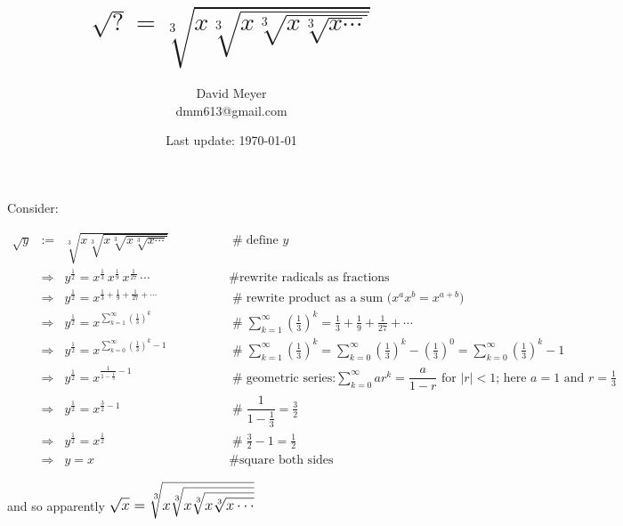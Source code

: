 \documentclass{article}
\title{$\sqrt{?} = \sqrt[3]{ x \sqrt[3] {x \sqrt[3]{x \sqrt[3]{x \cdots}}}}$}
\author{David Meyer \\ dmm613@gmail.com}
\date{Last update: \today}
\theoremstyle{definition}
\begin{document}
\maketitle

\noindent
Consider:

\begin{center}
\begin{equation*}
\begin{array}{llll}
\sqrt{y}
&:=&  \sqrt[3]{ x \sqrt[3] {x \sqrt[3]{x \sqrt[3]{x \cdots}}}}
				&\qquad \qquad \mathrel{\#} \text{define $y$} \\
[15pt]
&\Rightarrow& y^{\frac{1}{2}} = x^{\frac{1}{3}} \,  x^{\frac{1}{9}} \,  x^{\frac{1}{27}} \,  \cdots
				&\qquad \qquad \mathrel{\#} \text{rewrite radicals as fractions} \\
[15pt]
&\Rightarrow& y^{\frac{1}{2}} = x^{\frac{1}{3} + \frac{1}{9} + \frac{1}{27} + \cdots}
				&\qquad \qquad \mathrel{\#} \text{rewrite product as a sum ($x^{a}x^{b} = x^{a + b}$)}  \\
[12pt]
&\Rightarrow& y^{\frac{1}{2}} = x^{\sum\limits_{k = 1}^{\infty} {(\frac{1}{3})}^{k}}
				&\qquad \qquad \mathrel{\#} \sum\limits_{k = 1}^{\infty} {(\frac{1}{3})}^{k}  = \frac{1}{3} + \frac{1}{9} + \frac{1}{27} +  \cdots \\
[15pt]
&\Rightarrow& y^{\frac{1}{2}} = x^{\sum\limits_{k = 0}^{\infty} {(\frac{1}{3})}^{k} - 1}
				&\qquad \qquad \mathrel{\#}  \sum\limits_{k = 1}^{\infty} {(\frac{1}{3})}^{k}
				=  \sum\limits_{k = 0}^{\infty} {(\frac{1}{3})}^{k} \! -  {(\frac{1}{3})}^0 
				= \sum\limits_{k = 0}^{\infty} {(\frac{1}{3})}^{k} \! - 1 \\
[15pt]
&\Rightarrow& y^{\frac{1}{2}} = x^{\frac{1}{1- \frac{1}{3}}  - 1}
				&\qquad \qquad \mathrel{\#} \text{geometric series:} \sum\limits_{k = 0}^{\infty}  ar^k  = \dfrac{a}{1-r} \text{ for }  |r| < 1 \text{; here }  a = 1  \text{ and }  r = \frac{1}{3}  \\
[15pt]
&\Rightarrow& y^{\frac{1}{2}} = x^{\frac{3}{2}- 1}
				&\qquad \qquad \mathrel{\#}  \dfrac{1}{1 - \frac{1}{3}}  = \frac{3}{2} \\
[15pt]
&\Rightarrow& y^{\frac{1}{2}} = x^{\frac{1}{2}}
				&\qquad \qquad \mathrel{\#} \frac{3}{2} - 1 = \frac{1}{2} \\
[15pt]
&\Rightarrow& y  = x
				&\qquad \qquad \mathrel{\#} \text{square both sides}
\end{array}
\end{equation*}
\end{center}

\bigskip
\noindent
and so apparently $\mathlarger{\mathlarger{\sqrt{x} = \sqrt[3]{ x \sqrt[3] {x \sqrt[3]{x \sqrt[3]{x \cdots}}}}}}$
\end{document}
